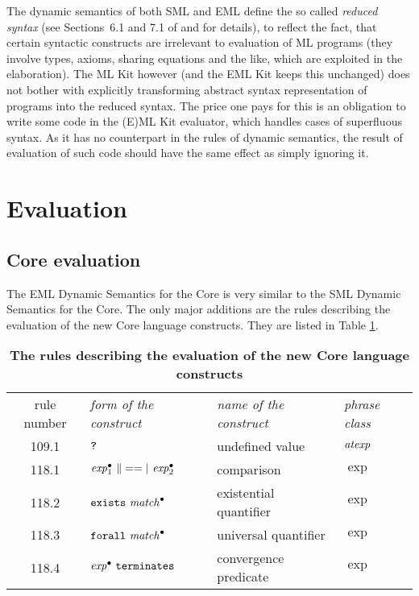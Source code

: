 The dynamic semantics of both SML and EML define the so called {\em reduced
syntax} (see Sections~6.1 and 7.1 of \cite{MTH90} and \cite{bib:KST94} for
details), to reflect the fact, that certain syntactic constructs are 
irrelevant to evaluation of ML programs (they involve types, axioms,
sharing equations and the like, which are exploited in the elaboration).
The ML Kit however (and the EML Kit keeps this unchanged) does not bother with
explicitly transforming abstract syntax representation of programs into
the reduced syntax.
The price one pays for this is an obligation to write some code
in the (E)ML Kit evaluator, which handles cases of superfluous
syntax.
As it has no counterpart in the rules of dynamic semantics, the result
of evaluation of such code should have the same effect as simply
ignoring it.

\section{Evaluation}

\subsection{Core evaluation}
\label{sec:core_eval}

The EML Dynamic Semantics for the Core is very similar to the
SML Dynamic Semantics for the Core. The only major additions
are the rules describing the evaluation of the new Core language constructs.
They are listed in Table \ref{tab:new_eval}.

\begin{longtable}{clll}
\caption[The rules describing the evaluation of the new Core language constructs]
{\bf  The rules describing the evaluation of the new Core language constructs\label{tab:new_eval}}\\
 rule number & \sl form of the construct & \sl name of the construct & \sl phrase class\\
109.1 &  {$\mbox{\tt ?}$}         & undefined value            &  ${\it atexp}$   \\
118.1 &  $\expb_1\ \|==|\ \expb_2$ & comparison          &  $\exp$     \\            
118.2 &  {$\mbox{${\tt exists}\ {\it match}^\bullet$}$}     & existential quantifier     &  $\exp$     \\
118.3 &  {$\mbox{${\tt forall}\ {\it match}^\bullet$}$}     & universal quantifier       &  $\exp$     \\
118.4 &  {$\mbox{${\it exp}^\bullet\ {\tt terminates}$}$}       & convergence predicate      &  $\exp$     \\
\end{longtable}


